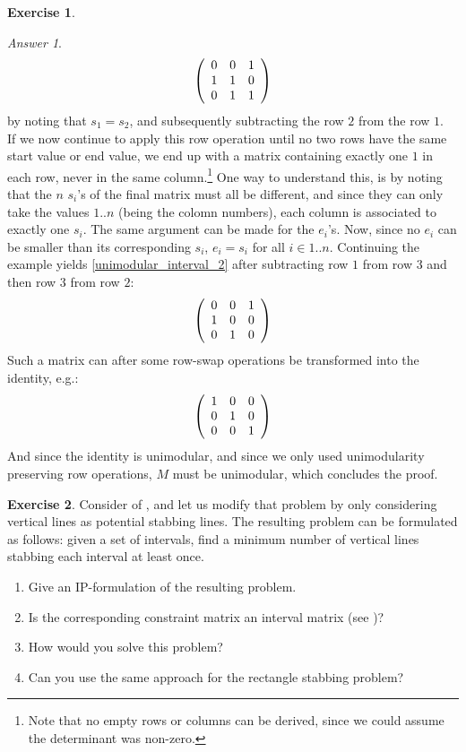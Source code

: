 \documentclass[titlepage]{book}
\theoremstyle{plain}
\theoremstyle{definition}
\newtheorem{exercise}{Exercise}[chapter]
\theoremstyle{remark}
\newtheorem{answer}{Answer}
\begin{document}
\begin{exercise}
\begin{answer}
\begin{equation}
\left( \begin{array}{ccc}
0&0&1\\
1&1&0\\
0&1&1
\end{array} \right)
\end{equation}
by noting that $s_1=s_2$, and subsequently subtracting the row $2$ from the row $1$.\\
If we now continue to apply this row operation until no two rows have the same start value or end value, we end up with a matrix containing exactly one $1$ in each row, never in the same column.\footnote{Note that no empty rows or columns can be derived, since we could assume the determinant was non-zero.} One way to understand this, is by noting that the $n$ $s_i$'s of the final matrix must all be different, and since they can only take the values $1..n$ (being the colomn numbers), each column is associated to exactly one $s_i$. The same argument can be made for the $e_i$'s. Now, since no $e_i$ can be smaller than its corresponding $s_i$, $e_i=s_i$ for all $i \in 1..n$. Continuing the example yields \ref{unimodular_interval_2} after subtracting row $1$ from row $3$ and then row $3$ from row $2$:
\begin{equation}
\label{unimodular_interval_2}
\left( \begin{array}{ccc}
0&0&1\\
1&0&0\\
0&1&0
\end{array} \right)
\end{equation}
Such a matrix can after some row-swap operations be transformed into the identity, e.g.:
\begin{equation}
\left( \begin{array}{ccc}
1&0&0\\
0&1&0\\
0&0&1
\end{array} \right)
\end{equation}
And since the identity is unimodular, and since we only used unimodularity preserving row operations, $M$ must be unimodular, which concludes the proof.
\end{answer}
\end{exercise}
\begin{exercise}
Consider  of , and let us modify that problem by only considering vertical lines as
potential stabbing lines. The resulting problem can be formulated as follows: given a set of intervals,
find a minimum number of vertical lines stabbing each interval at least once.
\begin{enumerate}
 \item Give an IP-formulation of the resulting problem.
 \item Is the corresponding constraint matrix an interval matrix (see )?
 \item How would you solve this problem?
 \item Can you use the same approach for the rectangle stabbing problem?
\end{enumerate}
\end{exercise}
\end{document}
